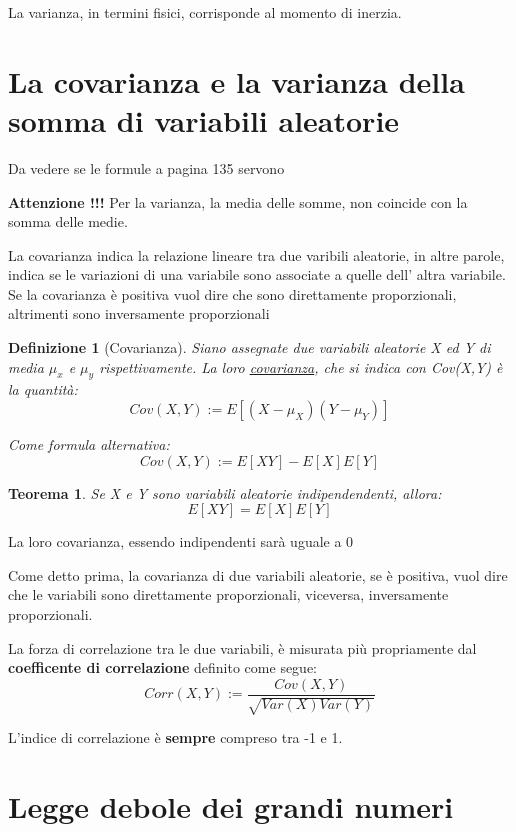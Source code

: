 \documentclass[12pt]{article}
\newtheorem{definition}{Definizione}[section]
\newtheorem{theorem}{Teorema}[section]
\begin{document}
La varianza, in termini fisici, corrisponde al momento di inerzia. 

\section{La covarianza e la varianza della somma di variabili aleatorie}

Da vedere se le formule a pagina 135 servono 

\textbf{Attenzione !!!} 
\newline
Per la varianza, la media delle somme, non coincide con la somma delle medie. 

La covarianza indica la relazione lineare tra due varibili aleatorie, in altre parole, indica
se le variazioni di una variabile sono associate a quelle dell' altra variabile. 
\newline
Se la covarianza è positiva vuol dire che sono direttamente proporzionali, altrimenti sono inversamente
proporzionali
\begin{definition}[Covarianza]
    Siano assegnate due variabili aleatorie X ed Y di media \(\mu_x\) e \(\mu_y\) rispettivamente. 
    La loro \underline{covarianza}, che si indica con Cov(X,Y) è la quantità:
    \[
    Cov(X,Y) := E[(X-\mu_X)(Y-\mu_Y)]    
    \]

    Come formula alternativa:
    \[
        Cov(X,Y) := E[XY] - E[X]E[Y]
    \]
\end{definition}

\begin{theorem}
    Se X e Y sono variabili aleatorie indipendendenti, allora:
    \[
    E[XY] = E[X]E[Y]    
    \]
\end{theorem}

La loro covarianza, essendo indipendenti sarà uguale a 0 

\newpage

Come detto prima, la covarianza di due variabili aleatorie, se è positiva, vuol dire
che le variabili sono direttamente proporzionali, viceversa, inversamente proporzionali. 

La forza di correlazione tra le due variabili, è misurata più propriamente dal
\textbf{coefficente di correlazione} definito come segue: 
\[
Corr(X,Y) := \frac{Cov(X,Y)}{\sqrt{Var(X)Var(Y)}}    
\]

L'indice di correlazione è \textbf{sempre} compreso tra -1 e 1.

\section{Legge debole dei grandi numeri}
\end{document}
